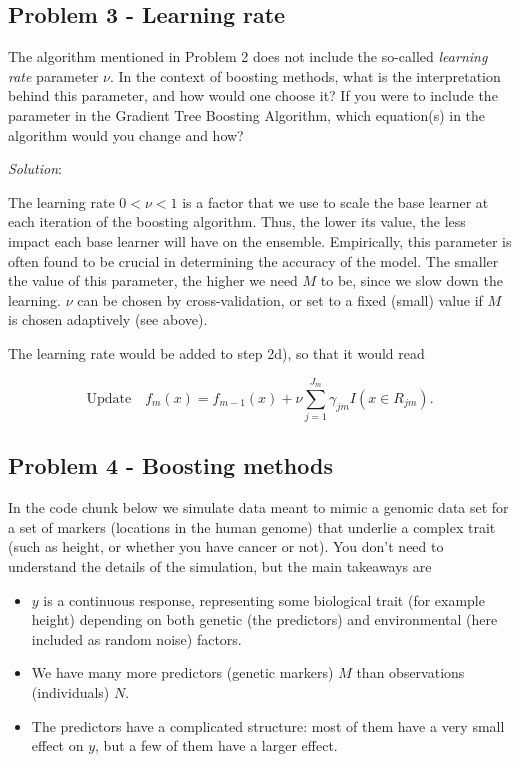 \documentclass[
]{article}
\providecommand{\tightlist}{%
  \setlength{\itemsep}{0pt}\setlength{\parskip}{0pt}}
\begin{document}
\hypertarget{problem-3---learning-rate}{%
\subsection{Problem 3 - Learning rate}\label{problem-3---learning-rate}}

The algorithm mentioned in Problem 2 does not include the so-called
\emph{learning rate} parameter \(\nu\). In the context of boosting
methods, what is the interpretation behind this parameter, and how would
one choose it? If you were to include the parameter in the Gradient Tree
Boosting Algorithm, which equation(s) in the algorithm would you change
and how?

\emph{Solution}:

The learning rate \(0<\nu<1\) is a factor that we use to scale the base
learner at each iteration of the boosting algorithm. Thus, the lower its
value, the less impact each base learner will have on the ensemble.
Empirically, this parameter is often found to be crucial in determining
the accuracy of the model. The smaller the value of this parameter, the
higher we need \(M\) to be, since we slow down the learning. \(\nu\) can
be chosen by cross-validation, or set to a fixed (small) value if \(M\)
is chosen adaptively (see above).

The learning rate would be added to step 2d), so that it would read

\[
\text{Update} \quad f_m(x)=f_{m-1}(x) + \nu \sum_{j=1}^{J_m} \gamma_{jm}I(x\in R_{jm}).
\]

\hypertarget{problem-4---boosting-methods}{%
\subsection{Problem 4 - Boosting
methods}\label{problem-4---boosting-methods}}

In the code chunk below we simulate data meant to mimic a genomic data
set for a set of markers (locations in the human genome) that underlie a
complex trait (such as height, or whether you have cancer or not). You
don't need to understand the details of the simulation, but the main
takeaways are

\begin{itemize}
\tightlist
\item
  \(y\) is a continuous response, representing some biological trait
  (for example height) depending on both genetic (the predictors) and
  environmental (here included as random noise) factors.
\item
  We have many more predictors (genetic markers) \(M\) than observations
  (individuals) \(N\).
\item
  The predictors have a complicated structure: most of them have a very
  small effect on \(y\), but a few of them have a larger effect.
\end{itemize}
\end{document}
